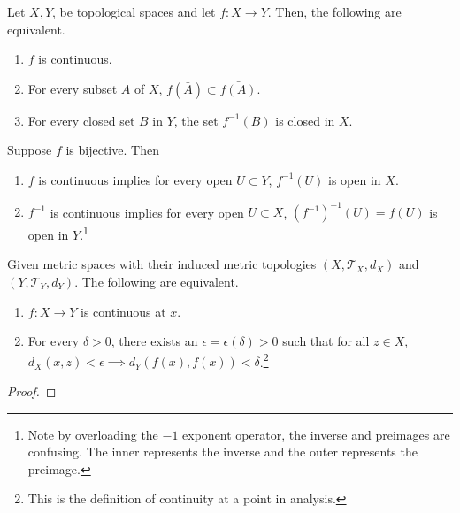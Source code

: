 \documentclass{article}
\begin{document}
    \begin{theorem}
      Let $X, Y$, be topological spaces and let $f: X \longrightarrow Y$. Then, the following are equivalent. 
      \begin{enumerate}
        \item $f$ is continuous. 
        \item For every subset $A$ of $X$, $f(\bar{A}) \subset \bar{f(A)}$. 
        \item For every closed set $B$ in $Y$, the set $f^{-1} (B)$ is closed in $X$. 
      \end{enumerate}
    \end{theorem}  

    \begin{theorem}
      Suppose $f$ is bijective. Then 
      \begin{enumerate}
        \item $f$ is continuous implies for every open $U \subset Y$, $f^{-1} (U)$ is open in $X$. 
        \item $f^{-1}$ is continuous implies for every open $U \subset X$, $(f^{-1})^{-1} (U) = f(U)$ is open in $Y$.\footnote{Note by overloading the $-1$ exponent operator, the inverse and preimages are confusing. The inner represents the inverse and the outer represents the preimage. }
      \end{enumerate}
    \end{theorem} 

    \begin{theorem}[Analytic Continuity = Topological Continuity] 
      Given metric spaces with their induced metric topologies $(X, \mathscr{T}_X, d_X)$ and $(Y, \mathscr{T}_Y, d_Y)$. The following are equivalent. 
      \begin{enumerate}
        \item $f: X \rightarrow Y$ is continuous at $x$. 
        \item For every $\delta > 0$, there exists an $\epsilon = \epsilon(\delta) > 0$ such that for all $z \in X$, $d_X (x, z) < \epsilon \implies d_Y (f(x), f(x)) < \delta$.\footnote{This is the definition of continuity at a point in analysis.} 
      \end{enumerate}
    \end{theorem}
    \begin{proof}
      
    \end{proof}
\end{document}
